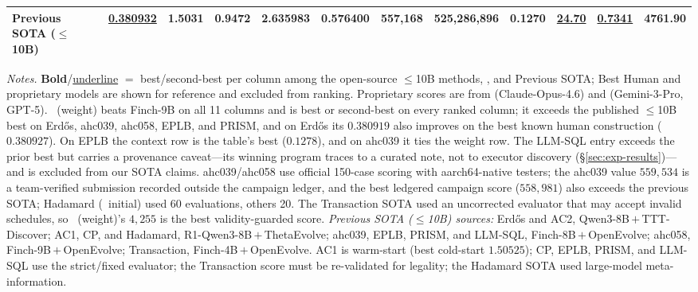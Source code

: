 \begin{table}[!t]
{\begin{tabular}{l ccccc cc cccc}
\midrule

\textbf{Previous SOTA ($\leq$10B)}
& \underline{0.380932} & \textbf{1.5031} & \textbf{0.9472} & \textbf{2.635983} & \textbf{0.576400}
& 557{,}168 & 525{,}286{,}896 & 0.1270 & \underline{24.70} & \underline{0.7341} & \textbf{4761.90} \\
\bottomrule
\end{tabular}%
}

\vspace{3pt}
\begin{flushleft}
\footnotesize
\textit{Notes.} \textbf{Bold}/\underline{underline} $=$ best/second-best per
column among the open-source $\leq$10B methods, \method, and Previous SOTA; Best
Human and proprietary models are shown for reference and excluded from ranking.
Proprietary scores are from \citep{qu2026coral} (Claude-Opus-4.6) and
\citep{liu2026evox} (Gemini-3-Pro, GPT-5). \method~(weight) beats Finch-9B on all
11 columns and is best or second-best on every ranked column; it exceeds the
published $\le$10B best on Erd\H{o}s, ahc039, ahc058, EPLB, and PRISM, and on
Erd\H{o}s its $0.380919$ also improves on the best known human construction
($0.380927$).  On EPLB the context row is the table's best ($0.1278$), and on
ahc039 it ties the weight row.
The LLM-SQL entry exceeds the prior best but carries a provenance caveat---its
winning program traces to a curated note, not to executor discovery
(\S\ref{sec:exp-results})---and is excluded from our SOTA claims.  ahc039/ahc058 use official 150-case
scoring with aarch64-native testers; the ahc039 value $559{,}534$ is a
team-verified submission recorded outside the campaign ledger, and the best
ledgered campaign score ($558{,}981$) also exceeds the previous SOTA; Hadamard (\method~initial) used 60
evaluations, others 20. The Transaction SOTA used an uncorrected evaluator that
may accept invalid schedules, so \method~(weight)'s $4{,}255$ is the best
validity-guarded score.
\textit{Previous SOTA ($\leq$10B) sources:} Erd\H{o}s and AC2, Qwen3-8B\,$+$\,TTT-Discover;
AC1, CP, and Hadamard, R1-Qwen3-8B\,$+$\,ThetaEvolve; ahc039, EPLB, PRISM, and
LLM-SQL, Finch-8B\,$+$\,OpenEvolve; ahc058, Finch-9B\,$+$\,OpenEvolve; Transaction,
Finch-4B\,$+$\,OpenEvolve. AC1 is warm-start (best cold-start $1.50525$); CP, EPLB,
PRISM, and LLM-SQL use the strict/fixed evaluator; the Transaction score must be
re-validated for legality; the Hadamard SOTA used large-model meta-information.
\end{flushleft}
\end{table}
